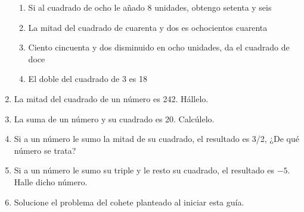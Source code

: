 \documentclass[letterpaper,11pt,twoside]{article}
\begin{document}
\begin{enumerate}
 \begin{enumerate}
 \item Si al cuadrado de ocho le añado 8 unidades, obtengo setenta y seis
 \item La mitad del cuadrado de cuarenta y dos es ochocientos cuarenta
 \item Ciento cincuenta y dos disminuido en ocho unidades, da el cuadrado de doce
 \item El doble del cuadrado de 3 es 18
 \end{enumerate}
 \item La mitad del cuadrado de un número es 242. Hállelo.
 \item La suma de un número y su cuadrado es 20. Calcúlelo.
 \item Si a un número le sumo la mitad de su cuadrado, el resultado es 3/2, ¿De qué número se trata?
 \item Si a un número le sumo su triple y le resto su cuadrado, el resultado es $-5$. Halle dicho número.
 \item Solucione el problema del cohete planteado al iniciar esta guía.
 \end{enumerate}
\end{document}
